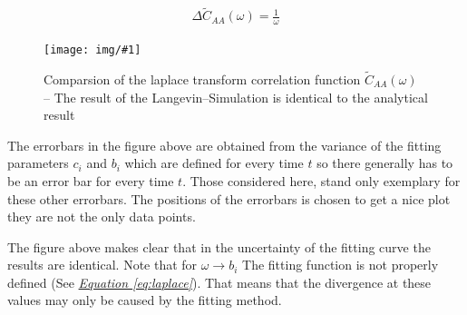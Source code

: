 \documentclass[a4paper, parskip=half]{scrartcl}
\newcommand{\myImage}[2]{
	\begin{figure}[H]
	\centering
	\texttt{[image: img/\#1]}
	\caption{#2}
	\label{pic:#1}
	\end{figure}
}
\newcommand{\myEqRef}[1]{\textit{\hyperref[eq:#1]{Equation \ref*{eq:#1}}}}
\begin{document}
\begin{align}
\Delta\widetilde{C}_{AA}(\omega) = \frac{1}{\omega}
\end{align}

\myImage{compare_lac}{Comparsion of the laplace transform correlation function $\widetilde{C}_{AA}(\omega)$ -- The result of the Langevin--Simulation is identical to the analytical result}

The errorbars in the figure above are obtained from the variance of the fitting parameters $c_i$ and $b_i$ which are defined for every time $t$ so there generally has to be an error bar for every time $t$. Those considered here, stand only exemplary for these other errorbars. The positions of the errorbars is chosen to get a nice plot they are not the only data points. 

The figure above makes clear that in the uncertainty of the fitting curve the results are identical. Note that for $\omega \rightarrow b_i$ The fitting function is not properly defined (See \myEqRef{laplace}). That means that the divergence at these values may only be caused by the fitting method.
\end{document}
